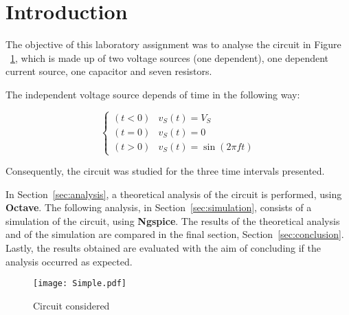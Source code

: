 \newpage

\section{Introduction}
\label{sec:introduction}

The objective of this laboratory assignment was to analyse the circuit in Figure ~\ref{circuit}, which is made up of two voltage sources (one dependent), one dependent current source, one capacitor and seven resistors.

The independent voltage source depends of time in the following way:

\begin{equation}
  \begin{cases}
    (t < 0) & v_S(t) = V_S \\
    (t = 0) & v_S(t) = 0 \\
    (t > 0) & v_S(t) = \sin(2\pi ft)
  \end{cases}
\end{equation}

Consequently, the circuit was studied for the three time intervals presented.

In Section~\ref{sec:analysis}, a theoretical analysis of the circuit is performed, using {\bf Octave}. The following analysis, in Section~\ref{sec:simulation}, consists of a simulation of the circuit, using {\bf Ngspice}. The results of the theoretical analysis and of the simulation are compared in the final section, Section~\ref{sec:conclusion}. Lastly, the results obtained are evaluated with the aim of concluding if the analysis occurred as expected.




\begin{figure}[H]
  \centering
  \texttt{[image: Simple.pdf]}
  \caption{Circuit considered}
  \label{circuit}
\end{figure}

